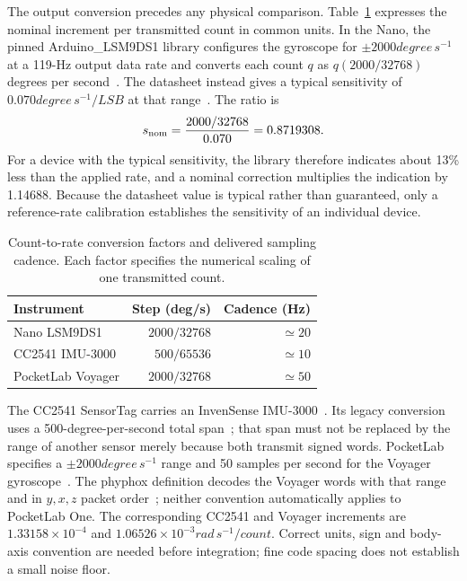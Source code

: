 The output conversion precedes any physical comparison. Table~\ref{tab:gyro-conversions} expresses the nominal increment per transmitted count in common units. In the Nano, the pinned Arduino\_LSM9DS1 library configures the gyroscope for $\pm2000\unit{degree\,s^{-1}}$ at a 119-Hz output data rate and converts each count $q$ as $q(2000/32768)$ degrees per second~\cite{arduinoimu}. The datasheet instead gives a typical sensitivity of $0.070\unit{degree\,s^{-1}/LSB}$ at that range~\cite{lsm9ds1}. The ratio is
\begin{equation}
 s_{\rm nom}=\frac{2000/32768}{0.070}=0.8719308.
 \label{eq:gyro-scale}
\end{equation}
For a device with the typical sensitivity, the library therefore indicates about 13\% less than the applied rate, and a nominal correction multiplies the indication by 1.14688. Because the datasheet value is typical rather than guaranteed, only a reference-rate calibration establishes the sensitivity of an individual device.

\begin{table}[t]
\caption{Count-to-rate conversion factors and delivered sampling cadence. Each factor specifies the numerical scaling of one transmitted count.}
\label{tab:gyro-conversions}
\centering\small
\begin{tabular}{@{}lrr@{}}
\toprule
Instrument & Step (deg/s) & Cadence (Hz)\\
\midrule
Nano LSM9DS1 & $2000/32768$ & $\simeq20$\\
CC2541 IMU-3000 & $500/65536$ & $\simeq10$\\
PocketLab Voyager & $2000/32768$ & $\simeq50$\\
\bottomrule
\end{tabular}
\end{table}

The CC2541 SensorTag carries an InvenSense IMU-3000~\cite{cc2541quick}. Its legacy conversion uses a 500-degree-per-second total span~\cite{cc2541protocol}; that span must not be replaced by the range of another sensor merely because both transmit signed words. PocketLab specifies a $\pm2000\unit{degree\,s^{-1}}$ range and 50 samples per second for the Voyager gyroscope~\cite{voyagerspec}. The phyphox definition decodes the Voyager words with that range and in $y,x,z$ packet order~\cite{voyagerprotocol}; neither convention automatically applies to PocketLab One. The corresponding CC2541 and Voyager increments are $1.33158\times10^{-4}$ and $1.06526\times10^{-3}\unit{rad\,s^{-1}/count}$. Correct units, sign and body-axis convention are needed before integration; fine code spacing does not establish a small noise floor.

